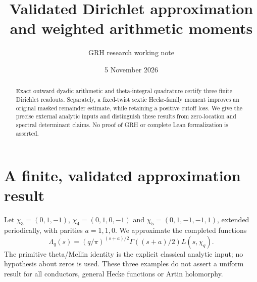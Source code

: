 \documentclass[11pt]{article}
\title{Validated Dirichlet approximation and weighted arithmetic moments}
\author{GRH research working note}
\date{5 November 2026}
\begin{document}
\maketitle
\begin{abstract}Exact outward dyadic arithmetic and theta-integral quadrature certify three finite Dirichlet readouts. Separately, a fixed-twist sextic Hecke-family moment improves an original masked remainder estimate, while retaining a positive cutoff loss. We give the precise external analytic inputs and distinguish these results from zero-location and spectral determinant claims. No proof of GRH or complete Lean formalization is asserted.\end{abstract}
\section{A finite, validated approximation result}
Let $\chi_3=(0,1,-1)$, $\chi_4=(0,1,0,-1)$ and
$\chi_5=(0,1,-1,-1,1)$, extended periodically, with parities $a=1,1,0$.
We approximate the completed functions
\[
 \Lambda_q(s)=(q/\pi)^{(s+a)/2}\Gamma((s+a)/2)L(s,\chi_q).
\]
The primitive theta/Mellin identity is the explicit classical analytic input;
no hypothesis about zeros is used. These three examples do not assert a
uniform result for all conductors, general Hecke functions or Artin holomorphy.
\end{document}
